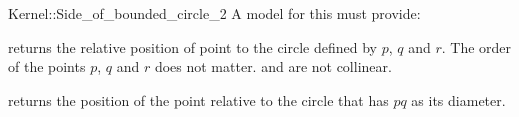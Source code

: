 \begin{ccRefFunctionObjectConcept}{Kernel::Side_of_bounded_circle_2}
A model for this must provide:


         {returns the relative position of point 
          to the circle defined by $p$, $q$ and $r$. The order
          of the points $p$, $q$ and $r$ does not matter.
          \ccPrecond {} and  are not collinear.}

         {returns the position of the point  relative to the circle
          that has $pq$ as its diameter.}

\end{ccRefFunctionObjectConcept}
